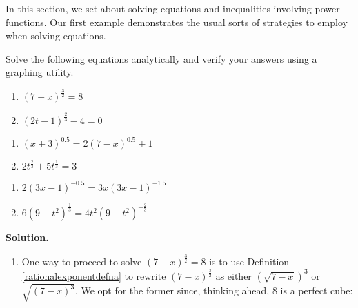 

\setcounter{footnote}{0}

\label{PowerEqIneq}

In this section, we set about solving equations and inequalities involving power functions.  Our first example demonstrates the usual sorts of strategies to employ when solving equations.

\begin{ex} \label{powerequationex}  Solve the following equations analytically and verify your answers using a graphing utility.


\begin{multicols}{2}
\begin{enumerate}

\item \label{first} $(7-x)^{\frac{3}{2}} = 8$ 
\item \label{second} $(2t-1)^{\frac{2}{3}} -4 = 0$

\setcounter{HW}{\value{enumi}}
\end{enumerate}
\end{multicols}

\begin{multicols}{2}
\begin{enumerate}
\setcounter{enumi}{\value{HW}}

\item $(x+3)^{0.5} = 2(7-x)^{0.5}+1$ 
\item $2t^{\frac{2}{3}} + 5t^{\frac{1}{3}} = 3$

\setcounter{HW}{\value{enumi}}
\end{enumerate}
\end{multicols}


\begin{multicols}{2}
\begin{enumerate}
\setcounter{enumi}{\value{HW}}

\item $2(3x-1)^{-0.5}  = 3x (3x-1)^{-1.5}$ 
\item $6(9-t^2)^{\frac{1}{3}} = 4t^2 (9-t^2)^{-\frac{2}{3}}$

\setcounter{HW}{\value{enumi}}
\end{enumerate}
\end{multicols}

{\bf Solution.}

\begin{enumerate}

\item  One way to proceed to solve  $(7-x)^{\frac{3}{2}} = 8$ is to use Definition \ref{rationalexponentdefna} to rewrite $(7-x)^{\frac{3}{2}}$ as either $(\sqrt{7-x})^3$ or $\sqrt{(7-x)^3}$.  We opt for the former since, thinking ahead,  $8$ is a perfect cube: 


\end{enumerate}
\end{ex}
